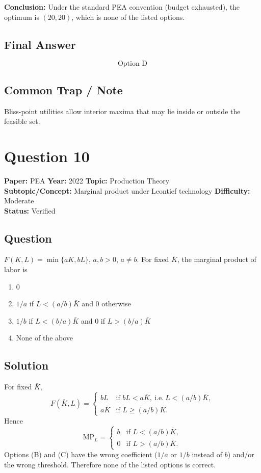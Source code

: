 \documentclass[11pt]{article}
\begin{document}
\textbf{Conclusion:} Under the standard PEA convention (budget exhausted), the optimum is
$(20, 20)$, which is none of the listed options.

\subsection*{Final Answer}
\[
\boxed{\text{Option D}}
\]

\subsection*{Common Trap / Note}
Bliss-point utilities allow interior maxima that may lie inside or outside the feasible set.

\section*{Question 10}
\textbf{Paper:} PEA \quad \textbf{Year:} 2022 \quad \textbf{Topic:} Production Theory \\
\textbf{Subtopic/Concept:} Marginal product under Leontief technology \quad \textbf{Difficulty:} Moderate \\
\textbf{Status:} Verified

\subsection*{Question}
$F(K,L) = \min\{aK, bL\}$, $a,b>0$, $a \neq b$. For fixed $\bar K$, the marginal product of labor is
\begin{enumerate}[label=(\Alph*)]
\item $0$
\item $1/a$ if $L < (a/b)\bar K$ and $0$ otherwise
\item $1/b$ if $L < (b/a)\bar K$ and $0$ if $L > (b/a)\bar K$
\item None of the above
\end{enumerate}

\subsection*{Solution}
For fixed $\bar K$,
\[
F(\bar K, L) = \begin{cases} bL & \text{if } bL < a\bar K,\ \text{i.e.}\ L < (a/b)\bar K, \\ a\bar K & \text{if } L \geq (a/b)\bar K. \end{cases}
\]
Hence
\[
\text{MP}_L = \begin{cases} b & \text{if } L < (a/b)\bar K, \\ 0 & \text{if } L > (a/b)\bar K. \end{cases}
\]
Options (B) and (C) have the wrong coefficient ($1/a$ or $1/b$ instead of $b$) and/or the wrong threshold. Therefore none of the listed options is correct.
\end{document}
